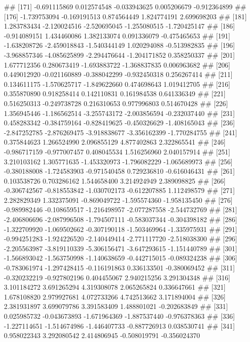 \documentclass[
]{article}
\begin{document}
\begin{enumerate}[label=(\alph*)]
##  [171] -0.691115869  0.012574548 -0.033943625  0.005206679 -0.912364899
##  [176] -1.739753094 -0.169191513  0.874564449  1.824774191  2.699698203
##  [181]  1.283783434 -2.120024516 -2.520695045 -1.255080515 -1.720425147
##  [186] -0.914089151  1.434460086  1.382133074  0.091336079 -0.475465653
##  [191] -1.638208726 -2.459018843 -1.540344149  1.020294088 -0.513982835
##  [196] -3.968857346 -4.085625899 -2.294476644 -1.204171852  0.358250337
##  [201]  1.677712356  0.280673419 -1.693883722 -1.368837835  0.006963682
##  [206]  0.449012920 -0.021160889 -0.388042299 -0.932450318  0.256267414
##  [211]  0.134611175 -1.570625717 -1.849622660  0.474698643  1.019412705
##  [216]  0.355870890  0.918258414  0.142110831  0.161984538  0.641336349
##  [221]  0.516250313 -0.249738728  0.216310653  0.977996803  0.514670428
##  [226]  1.356945446 -1.186562514 -3.255743172 -2.003856594 -0.232037440
##  [231]  0.458283342 -0.384759164 -0.828419625 -0.450326629 -1.408165043
##  [236] -2.847252785 -2.876269475 -3.918838677 -3.356162399 -1.770284755
##  [241]  0.375844623  1.266524990  2.096855129  4.877402863  2.322865541
##  [246] -0.986717159 -0.977007457  0.408045534  1.516256960  2.040157914
##  [251]  3.210103162  1.305771635 -1.453320973 -1.796082229 -1.065689973
##  [256] -0.380188008 -1.724583903 -0.971540458  0.729236810 -0.616046431
##  [261]  0.103538726  0.703286162  1.544658400  3.214924949  2.389098825
##  [266] -0.306742567 -0.818553842 -1.030702173 -0.612207885  1.112498579
##  [271]  2.282829349  1.332375091 -0.869049722 -1.595574360 -1.958135450
##  [276] -0.989982446 -0.108659517 -1.216498957 -2.077287558 -2.544732769
##  [281] -2.406806696 -2.087996508 -1.794507111 -0.583037344 -0.304398182
##  [286] -1.322709920 -1.069502662 -0.307190118 -1.503469964 -1.335975931
##  [291] -0.994251283 -1.924226520 -2.140449414 -2.771117720 -2.518038300
##  [296] -2.205563987 -3.819110339 -5.306156471 -3.647293615 -1.151440789
##  [301] -1.566893042 -1.563750998 -1.140638659 -0.442715015 -0.089324238
##  [306] -0.783061974 -1.297428415 -0.116191863  0.336133501 -0.380069452
##  [311] -0.320232219 -0.927802196  0.404455067  2.940215256  3.291304348
##  [316]  3.101184272  3.691265294  4.319308078  2.065265824  0.336647661
##  [321]  1.678108820  2.979927681  4.072733266  4.742513662  3.171894004
##  [326]  2.381931897  3.699079786  3.391583409  1.488801021 -0.202683849
##  [331]  0.025985732 -0.043673893 -1.671964369 -1.887537440 -0.976378363
##  [336] -1.227114651 -1.514674986 -1.446407733 -0.887726913  0.038530741
##  [341]  0.958022343  3.292080542  2.414806945 -0.508019791 -0.356024370

\end{enumerate}
\end{document}

